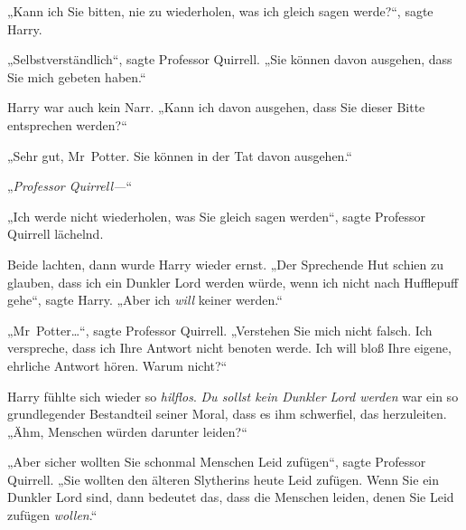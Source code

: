 „Kann ich Sie bitten, nie zu wiederholen, was ich gleich sagen werde?“, sagte Harry.

„Selbstverständlich“, sagte Professor Quirrell. „Sie können davon ausgehen, dass Sie mich gebeten haben.“

Harry war auch kein Narr. „Kann ich davon ausgehen, dass Sie dieser Bitte entsprechen werden?“

„Sehr gut, Mr~Potter. Sie können in der Tat davon ausgehen.“

„\emph{Professor Quirrell—}“

„Ich werde nicht wiederholen, was Sie gleich sagen werden“, sagte Professor Quirrell lächelnd.

Beide lachten, dann wurde Harry wieder ernst. „Der Sprechende Hut schien zu glauben, dass ich ein Dunkler Lord werden würde, wenn ich nicht nach Hufflepuff gehe“, sagte Harry. „Aber ich \emph{will} keiner werden.“

„Mr~Potter…“, sagte Professor Quirrell. „Verstehen Sie mich nicht falsch. Ich verspreche, dass ich Ihre Antwort nicht benoten werde. Ich will bloß Ihre eigene, ehrliche Antwort hören. Warum nicht?“

Harry fühlte sich wieder so \emph{hilflos}. \emph{Du sollst kein Dunkler Lord werden} war ein so grundlegender Bestandteil seiner Moral, dass es ihm schwerfiel, das herzuleiten. „Ähm, Menschen würden darunter leiden?“

„Aber sicher wollten Sie schonmal Menschen Leid zufügen“, sagte Professor Quirrell. „Sie wollten den älteren Slytherins heute Leid zufügen. Wenn Sie ein Dunkler Lord sind, dann bedeutet das, dass die Menschen leiden, denen Sie Leid zufügen \emph{wollen}.“

